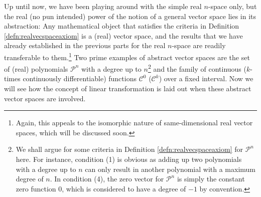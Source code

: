 Up until now, we have been playing around with the simple real $n$-space only, but the real (no pun intended) power of the notion of a general vector space lies in its abstraction: Any mathematical object that satisfies the criteria in Definition \ref{defn:realvecspaceaxiom} is a (real) vector space, and the results that we have already established in the previous parts for the real $n$-space are readily transferable to them.\footnote{Again, this appeals to the isomorphic nature of same-dimensional real vector spaces, which will be discussed soon.} Two prime examples of abstract vector spaces are the set of (real) polynomials $\mathcal{P}^n$ with a degree up to $n$\footnote{We shall argue for some criteria in Definition \ref{defn:realvecspaceaxiom} for $\mathcal{P}^n$ here. For instance, condition (1) is obvious as adding up two polynomials with a degree up to $n$ can only result in another polynomial with a maximum degree of $n$. In condition (4), the zero vector for $\mathcal{P}^n$ is simply the constant zero function $0$, which is considered to have a degree of $-1$ by convention.} and the family of continuous ($k$-times continuously differentiable) functions $\mathcal{C}^0$ ($\mathcal{C}^k$) over a fixed interval. Now we will see how the concept of linear transformation is laid out when these abstract vector spaces are involved.

